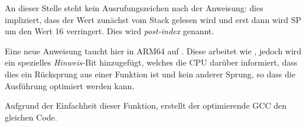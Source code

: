 An dieser Stelle steht kein Ausrufungszeichen nach der Anweisung: dies impliziert, dass der Wert zunächst
vom Stack gelesen wird und erst dann wird \ac{SP} um den Wert 16 verringert.
Dies wird \emph{post-index} genannt.

Eine neue Anweisung taucht hier in ARM64 auf \RET.
Diese arbeitet wie , jedoch wird ein spezielles \emph{Hinweis-}Bit hinzugefügt, welches die \ac{CPU}
darüber informiert, dass dies ein Rücksprung aus einer Funktion ist und kein anderer Sprung, so dass die
Ausführung optimiert werden kann.

Aufgrund der Einfachheit dieser Funktion, erstellt der optimierende GCC den gleichen Code.
